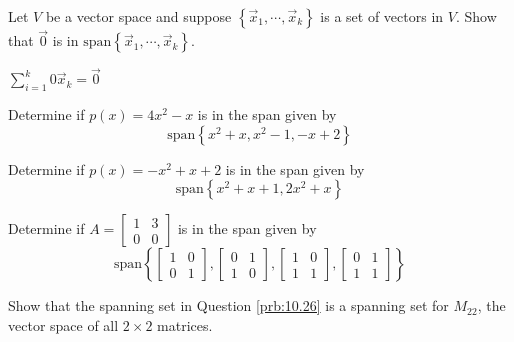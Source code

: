 \documentclass{ximera}
\begin{document}
\begin{problem}\label{prb:10.23} Let $V$ be a vector space and suppose $\left\{ \vec{x}_{1},\cdots ,
\vec{x}_{k}\right\}$ is a set of vectors in $V$. Show that $\vec{0}$
is in $\mbox{span}\left\{ \vec{x}_{1},\cdots ,\vec{x}_{k}\right\} .$
\begin{hint}
$\sum_{i=1}^{k}0\vec{x}_{k}=\vec{0}$
\end{hint}
\end{problem}

\begin{problem}\label{prb:10.24} Determine if $p(x) = 4x^2-x$ is in the span given by
\[
\mbox{span} \left\{ x^2+x, x^2-1, -x + 2 \right\}
\]
\end{problem}

\begin{problem}\label{prb:10.25} Determine if $p(x) = - x^2 + x + 2 $ is in the span given by
\[
\mbox{span} \left\{ x^2 + x + 1, 2x^2 + x \right\}
\]
\end{problem}

\begin{problem}\label{prb:10.26} \label{spanmatrices} Determine if $A = \left[ \begin{array}{rr}
1 & 3 \\
0 & 0
\end{array} \right]$ is in the span given by
\[
\mbox{span} \left\{
\left[ \begin{array}{rr}
1 & 0 \\
0 & 1
\end{array} \right], \left[ \begin{array}{rr}
0 & 1 \\
1 & 0
\end{array} \right], \left[ \begin{array}{rr}
1 & 0 \\
1 & 1
\end{array} \right], \left[ \begin{array}{rr}
0 & 1 \\
1 & 1
\end{array} \right]
\right\}
\]
\end{problem}


\begin{problem}\label{prb:10.27} Show that the spanning set in Question \ref{prb:10.26} is a spanning set for $M_{22}$, the vector space of all $2 \times 2$ matrices.
\end{problem}
\end{document}
